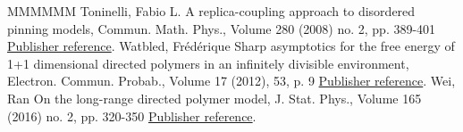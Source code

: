 \begin{thebibliography}{MMMMMM}
 Toninelli, Fabio L. A replica-coupling approach to disordered pinning models, Commun. Math. Phys., Volume 280 (2008) no. 2, pp. 389-401 \href{https://ahl.centre-mersenne.org/item/AHL_2020__3__299_0/#cf:Ton08}{Publisher reference}.
 Watbled, Frédérique Sharp asymptotics for the free energy of 1+1 dimensional directed polymers in an infinitely divisible environment, Electron. Commun. Probab., Volume 17 (2012), 53, p. 9 \href{https://ahl.centre-mersenne.org/item/AHL_2020__3__299_0/#cf:Wa12}{Publisher reference}.
 Wei, Ran On the long-range directed polymer model, J. Stat. Phys., Volume 165 (2016) no. 2, pp. 320-350 \href{https://ahl.centre-mersenne.org/item/AHL_2020__3__299_0/#cf:We15}{Publisher reference}.
\end{thebibliography}

